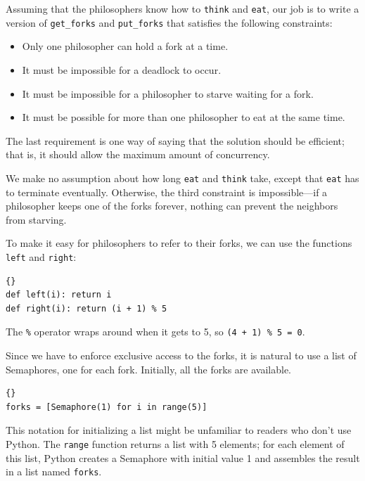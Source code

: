 \documentclass{book}
\begin{document}
Assuming that the philosophers know how to {\tt think} and {\tt eat},
our job is to write a version of {\tt get\_forks} and {\tt put\_forks}
that satisfies the following constraints:

\begin{itemize}

\item Only one philosopher can hold a fork at a time.

\item It must be impossible for a deadlock to occur.

\item It must be impossible for a philosopher to starve waiting
for a fork.

\item It must be possible for more than one philosopher
to eat at the same time.

\end{itemize}

The last requirement is one way of saying that the solution
should be efficient; that is, it should allow the maximum amount
of concurrency.

We make no assumption about how long {\tt eat} and {\tt think} take,
except that {\tt eat} has to terminate eventually.  Otherwise, the
third constraint is impossible---if a philosopher keeps one of the
forks forever, nothing can prevent the neighbors from starving.

To make it easy for philosophers to refer to their forks,
we can use the functions {\tt left} and {\tt right}:

\begin{lstlisting}[title={Which fork?}]{}
def left(i): return i
def right(i): return (i + 1) % 5
\end{lstlisting}

The {\tt \%} operator wraps around when it gets to 5, so
{\tt (4 + 1) \% 5 = 0}.

Since we have to enforce exclusive access to the forks,
it is natural to use a list of Semaphores, one for
each fork.  Initially, all the forks are available.

\begin{lstlisting}[title={Variables for dining philosophers}]{}
forks = [Semaphore(1) for i in range(5)]
\end{lstlisting}

This notation for initializing a list might be unfamiliar to
readers who don't use Python.  The {\tt range} function returns
a list with 5 elements; for each element of this list, Python
creates a Semaphore with initial value 1 and assembles the
result in a list named {\tt forks}.
\end{document}
